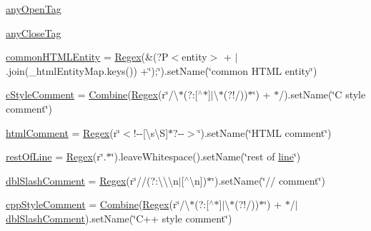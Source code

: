 \begin{DoxyCompactItemize}
\item 
\hyperlink{namespacesetuptools_1_1__vendor_1_1pyparsing_abd2f4eead0a78cb007bd0b0d4cbdc247}{any\+Open\+Tag}
\item 
\hyperlink{namespacesetuptools_1_1__vendor_1_1pyparsing_a9cfecde1955c1143e6b087fca45a50b4}{any\+Close\+Tag}
\item 
\hyperlink{namespacesetuptools_1_1__vendor_1_1pyparsing_a2b1bf0e55819af0b37867c6a82c51807}{common\+H\+T\+M\+L\+Entity} = \hyperlink{classsetuptools_1_1__vendor_1_1pyparsing_1_1_regex}{Regex}(\textquotesingle{}\&(?P$<$entity$>$\textquotesingle{} + \textquotesingle{}$\vert$\textquotesingle{}.join(\+\_\+html\+Entity\+Map.\+keys()) +\char`\"{});\char`\"{}).set\+Name(\char`\"{}common H\+T\+ML entity\char`\"{})
\item 
\hyperlink{namespacesetuptools_1_1__vendor_1_1pyparsing_ab30ff4c88df72aaa52cc0c8543c995e2}{c\+Style\+Comment} = \hyperlink{classsetuptools_1_1__vendor_1_1pyparsing_1_1_combine}{Combine}(\hyperlink{classsetuptools_1_1__vendor_1_1pyparsing_1_1_regex}{Regex}(r\char`\"{}/\textbackslash{}$\ast$(?\+:\mbox{[}$^\wedge$$\ast$\mbox{]}$\vert$\textbackslash{}$\ast$(?!/))$\ast$\char`\"{}) + \textquotesingle{}$\ast$/\textquotesingle{}).set\+Name(\char`\"{}C style comment\char`\"{})
\item 
\hyperlink{namespacesetuptools_1_1__vendor_1_1pyparsing_ae2598f755402aec422e1d9977186156f}{html\+Comment} = \hyperlink{classsetuptools_1_1__vendor_1_1pyparsing_1_1_regex}{Regex}(r\char`\"{}$<$!-\/-\/\mbox{[}\textbackslash{}s\textbackslash{}S\mbox{]}$\ast$?-\/-\/$>$\char`\"{}).set\+Name(\char`\"{}H\+T\+ML comment\char`\"{})
\item 
\hyperlink{namespacesetuptools_1_1__vendor_1_1pyparsing_adaf89df22db48f42f6339874edb27c4e}{rest\+Of\+Line} = \hyperlink{classsetuptools_1_1__vendor_1_1pyparsing_1_1_regex}{Regex}(r\char`\"{}.$\ast$\char`\"{}).leave\+Whitespace().set\+Name(\char`\"{}rest of \hyperlink{namespacesetuptools_1_1__vendor_1_1pyparsing_ad42642ba9455cf9de12294141a2ead3c}{line}\char`\"{})
\item 
\hyperlink{namespacesetuptools_1_1__vendor_1_1pyparsing_abea5f9cf7a219d118afd0853030c9fbf}{dbl\+Slash\+Comment} = \hyperlink{classsetuptools_1_1__vendor_1_1pyparsing_1_1_regex}{Regex}(r\char`\"{}//(?\+:\textbackslash{}\textbackslash{}\textbackslash{}n$\vert$\mbox{[}$^\wedge$\textbackslash{}n\mbox{]})$\ast$\char`\"{}).set\+Name(\char`\"{}// comment\char`\"{})
\item 
\hyperlink{namespacesetuptools_1_1__vendor_1_1pyparsing_a273c8ece64619011bdeff7b7733e6a84}{cpp\+Style\+Comment} = \hyperlink{classsetuptools_1_1__vendor_1_1pyparsing_1_1_combine}{Combine}(\hyperlink{classsetuptools_1_1__vendor_1_1pyparsing_1_1_regex}{Regex}(r\char`\"{}/\textbackslash{}$\ast$(?\+:\mbox{[}$^\wedge$$\ast$\mbox{]}$\vert$\textbackslash{}$\ast$(?!/))$\ast$\char`\"{}) + \textquotesingle{}$\ast$/\textquotesingle{}$\vert$ \hyperlink{namespacesetuptools_1_1__vendor_1_1pyparsing_abea5f9cf7a219d118afd0853030c9fbf}{dbl\+Slash\+Comment}).set\+Name(\char`\"{}C++ style comment\char`\"{})

\end{DoxyCompactItemize}

